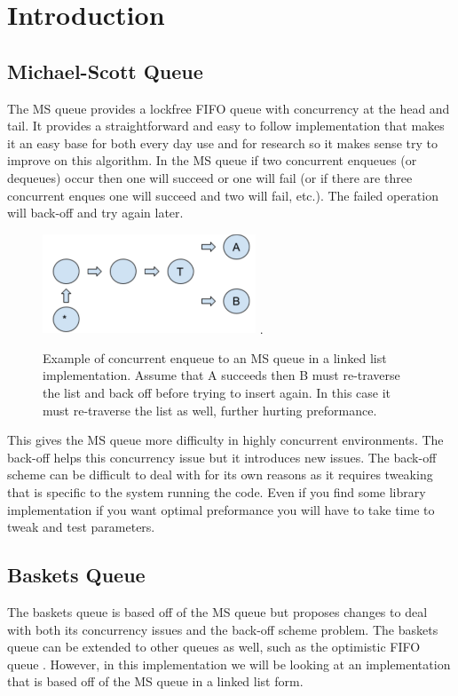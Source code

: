 \documentclass[conference]{IEEEtran}
\begin{document}
\IEEEpeerreviewmaketitle



\section{Introduction}
\subsection{Michael-Scott Queue}
The MS queue \cite{ms} provides a lockfree FIFO queue with concurrency at the head and tail.  It provides a straightforward and easy to follow implementation that makes it an easy base for both every day use and for research so it makes sense try to improve on this algorithm.  In the MS queue if two concurrent enqueues (or dequeues) occur then one will succeed or one will fail (or if there are three concurrent enques one will succeed and two will fail, etc.).  The failed operation will back-off and try again later.  

\begin{figure}[!h]
\centering
\includegraphics[width=2.5in]{msqueue}
\DeclareGraphicsExtensions.
\caption{Example of concurrent enqueue to an MS queue in a linked list implementation. Assume that A succeeds then B must re-traverse the list and back off before trying to insert again.  In this case it must re-traverse the list as well, further hurting preformance.}
\label{fig_sim}
\end{figure}

This gives the MS queue more difficulty in highly concurrent environments.  The back-off helps this concurrency issue but it introduces new issues.  The back-off scheme can be difficult to deal with for its own reasons as it requires tweaking that is specific to the system running the code.  Even if you find some library implementation if you want optimal preformance you will have to take time to tweak and test parameters.
\subsection{Baskets Queue}
The baskets queue \cite{baskets} is based off of the MS queue but proposes changes to deal with both its concurrency issues and the back-off scheme problem.  The baskets queue can be extended to other queues as well, such as the optimistic FIFO queue \cite{opt}.  However, in this implementation we will be looking at an implementation that is based off of the MS queue in a linked list form.
\end{document}
